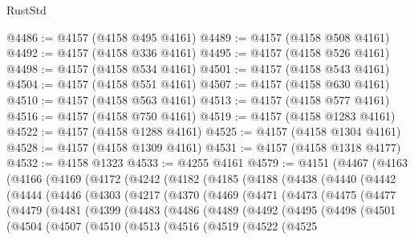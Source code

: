 \begin{lexlean}{RustStd}
\begin{coremodule}
@4486 := @4157 (@4158 @495 @4161)
@4489 := @4157 (@4158 @508 @4161)
@4492 := @4157 (@4158 @336 @4161)
@4495 := @4157 (@4158 @526 @4161)
@4498 := @4157 (@4158 @534 @4161)
@4501 := @4157 (@4158 @543 @4161)
@4504 := @4157 (@4158 @551 @4161)
@4507 := @4157 (@4158 @630 @4161)
@4510 := @4157 (@4158 @563 @4161)
@4513 := @4157 (@4158 @577 @4161)
@4516 := @4157 (@4158 @750 @4161)
@4519 := @4157 (@4158 @1283 @4161)
@4522 := @4157 (@4158 @1288 @4161)
@4525 := @4157 (@4158 @1304 @4161)
@4528 := @4157 (@4158 @1309 @4161)
@4531 := @4157 (@4158 @1318 @4177)
@4532 := @4158 @1323
@4533 := @4255 @4161
@4579 := @4151
    (@4467
      (@4163
        (@4166
          (@4169
            (@4172
              (@4242
                (@4182
                  (@4185
                    (@4188
                      (@4438
                        (@4440
                          (@4442
                            (@4444
                              (@4446
                                (@4303
                                  (@4217
                                    (@4370
                                      (@4469
                                        (@4471
                                          (@4473
                                            (@4475
                                              (@4477
                                                (@4479
                                                  (@4481
                                                    (@4399
                                                      (@4483
                                                        (@4486
                                                          (@4489
                                                            (@4492
                                                              (@4495
                                                                (@4498
                                                                  (@4501
                                                                    (@4504
                                                                      (@4507
                                                                        (@4510
                                                                          (@4513
                                                                            (@4516
                                                                              (@4519
                                                                                (@4522
                                                                                  (@4525

\end{coremodule}
\end{lexlean}
